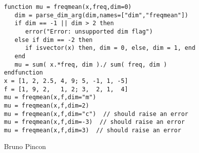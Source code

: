 \begin{examples}
\begin{Verbatim}
function mu = freqmean(x,freq,dim=0)
   dim = parse_dim_arg(dim,names=["dim","freqmean"])
   if dim == -1 || dim > 2 then
      error("Error: unsupported dim flag")
   else if dim == -2 then
      if isvector(x) then, dim = 0, else, dim = 1, end
   end
   mu = sum( x.*freq, dim )./ sum( freq, dim )
endfunction
x = [1, 2, 2.5, 4, 9; 5, -1, 1, -5]
f = [1, 9, 2,   1, 2; 3,  2, 1,  4]
mu = freqmean(x,f,dim="m")
mu = freqmean(x,f,dim=2)
mu = freqmean(x,f,dim="c")  // should raise an error
mu = freqmean(x,f,dim=-3)  // should raise an error
mu = freqmean(x,f,dim=3)  // should raise an error
\end{Verbatim}
\end{examples}

\begin{manseealso}
\end{manseealso}

\begin{authors}
  Bruno Pincon
\end{authors}


